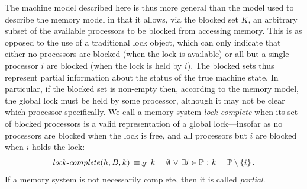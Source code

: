 \documentclass[11pt]{report}         %
\begin{document}

The machine model described here is thus more general than the model used to describe the memory model in that it allows, via the blocked set $K$, an arbitrary subset of the available processors to be blocked from accessing memory. This is as opposed to the use of a traditional lock object, which can only indicate that either no processors are blocked (when the lock is available) or all but a single processor $i$ are blocked (when the lock is held by $i$). The blocked sets thus represent partial information about the status of the true machine state. In particular, if the blocked set is non-empty then, according to the memory model, the global lock must be held by some processor, although it may not be clear which processor specifically. We call a memory system \emph{lock-complete} when its set of blocked processors is a valid representation of a global lock---insofar as no processors are blocked when the lock is free, and all processors but $i$ are blocked when $i$ holds the lock: \[ \text{\textit{lock-complete}}(h,B,k) \operatorname{\;\equiv_{\mathit{df}}\;} k = \operatorname{\emptyset} \operatorname{\,\vee\,} \exists i \in \mathbb{P} \operatorname{\,:\,} k = \mathbb{P} \setminus \left\lbrace i \right\rbrace.\] If a memory system is not necessarily complete, then it is called \emph{partial}.
\end{document}
